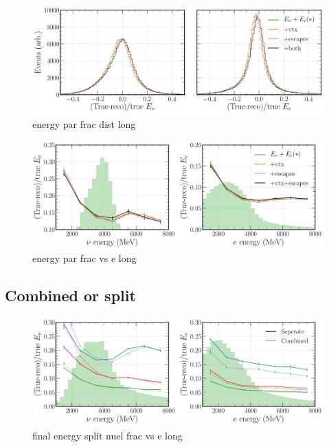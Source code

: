\begin{figure} %
    \includegraphics[width=\textwidth]{diagrams/7-cvn/chipsnet/energy_par_frac_dist.pdf}
    \caption[energy par frac dist short]
    {energy par frac dist long}
    \label{fig:energy_par_frac_dist}
\end{figure}

\begin{figure} %
    \includegraphics[width=\textwidth]{diagrams/7-cvn/chipsnet/energy_par_frac_vs_e.pdf}
    \caption[energy par frac vs e short]
    {energy par frac vs e long}
    \label{fig:energy_par_frac_vs_e}
\end{figure}

\subsection{Combined or split} %
\label{sec:cvn_energy_split} %

\begin{figure} %
    \includegraphics[width=\textwidth]{diagrams/7-cvn/chipsnet/final_energy_split_nuel_frac_vs_e.pdf}
    \caption[final energy split nuel frac vs e short]
    {final energy split nuel frac vs e long}
    \label{fig:final_energy_split_nuel_frac_vs_e}
\end{figure}

